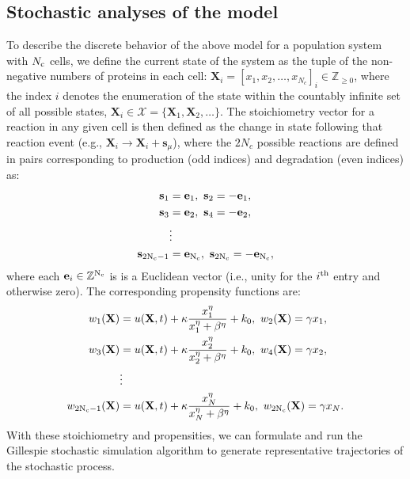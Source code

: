 \documentclass[12pt]{article}
\begin{document}
\subsection{Stochastic analyses of the model}
To describe the discrete behavior of the above model for a population system with $N_{\rm c}$ cells, we define the current state of the system as the tuple of the non-negative numbers of proteins in each cell: $\mathbf{X}_i = [x_{1},x_{2},\ldots,x_{N_c}]_i\in \mathbb{Z}_{\ge 0}$, where the index $i$ denotes the enumeration of the state within the countably infinite set of all possible states, $\mathbf{X}_i\in\mathcal{X}=\{\mathbf{X}_1,\mathbf{X}_2,\ldots\}$.
The stoichiometry vector for a reaction in any given cell is then defined as the change in state following that reaction event (e.g., $\mathbf{X}_i \rightarrow \mathbf{X}_i + \mathbf{s}_\mu$), where the $2N_c$ possible reactions are defined in pairs corresponding to production (odd indices) and degradation (even indices) as:
\begin{align}
\mathbf{s}_1 &= \mathbf{e}_1,\ \mathbf{s}_2 = -\mathbf{e}_1,\nonumber\\ 
\mathbf{s}_3 &= \mathbf{e}_2,\ \mathbf{s}_4 = -\mathbf{e}_2,\nonumber\\
&\vdots \nonumber\\ 
\mathbf{s}_{\rm 2N_c-1} &= \mathbf{e}_{\rm N_c},\ \mathbf{s}_{\rm 2N_c} = -\mathbf{e}_{\rm N_c}, \label{Stochs}
 \end{align}
where each $\mathbf{e}_{i}\in\mathbb{Z}^{{\rm N_ c}}$ is is a Euclidean vector (i.e., unity for the $i^{\rm th}$ entry and otherwise zero). The corresponding propensity functions are:
\begin{align}
w_1(\mathbf{X}) &= u(\mathbf{X},t)  + \kappa \frac{x_1^\eta}{x_1^{\eta}+\beta^{\eta}} + k_0,\ w_2(\mathbf{X}) = \gamma x_1,\nonumber\\
w_3(\mathbf{X}) &= u(\mathbf{X},t)  + \kappa \frac{x_2^\eta}{x_2^{\eta}+\beta^{\eta}} + k_0,\ w_4(\mathbf{X}) = \gamma x_2,\nonumber\\
&\vdots \nonumber\\
w_{\rm 2N_c-1}(\mathbf{X}) &= u(\mathbf{X},t)  + \kappa \frac{x_N^\eta}{x_N^{\eta}+\beta^{\eta}} + k_0,\ w_{\rm 2N_c}(\mathbf{X}) = \gamma x_N.\label{Props}
 \end{align}
With these stoichiometry and propensities, we can formulate and run the Gillespie stochastic simulation algorithm\cite{Gillespie1992,Gillespie1977} to generate representative trajectories of the stochastic process.
\end{document}
